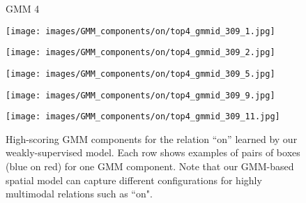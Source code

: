 \documentclass[10pt,twocolumn,letterpaper]{article}
\begin{document}
\begin{figure*}[t]
    \begin{minipage}[b]{0.005\textwidth}
    	\centering
    	\begin{turn}{90}
    GMM 4
    	\end{turn}
    	\vspace{1.5ex}
    \end{minipage}
    \hspace{0.01\textwidth}
    \begin{minipage}[b]{0.18\textwidth}
    	\centering
       	\texttt{[image: images/GMM\_components/on/top4\_gmmid\_309\_1.jpg]}
    \end{minipage}
    \hspace{0.005\textwidth}
    \begin{minipage}[b]{0.18\textwidth}
    	\centering
       	\texttt{[image: images/GMM\_components/on/top4\_gmmid\_309\_2.jpg]}
    \end{minipage}
    \hspace{0.005\textwidth}
    \begin{minipage}[b]{0.18\textwidth}
    	\centering
       	\texttt{[image: images/GMM\_components/on/top4\_gmmid\_309\_5.jpg]}
    \end{minipage}
    \hspace{0.005\textwidth}
	\begin{minipage}[b]{0.18\textwidth}
    	\centering
       	\texttt{[image: images/GMM\_components/on/top4\_gmmid\_309\_9.jpg]}
    \end{minipage}
    \hspace{0.005\textwidth}
    \begin{minipage}[b]{0.18\textwidth}
    	\centering
       	\texttt{[image: images/GMM\_components/on/top4\_gmmid\_309\_11.jpg]}
    \end{minipage}             
     
   \caption{High-scoring GMM components for the relation ``on'' learned by our weakly-supervised model. Each row shows examples of pairs of boxes ({\color{blue}blue} on {\color{red}red}) for one GMM component. Note that our GMM-based spatial model can capture different configurations for highly multimodal relations such as ``on".} 
      \vspace{-.2cm}
    \label{fig:multimodal}
\end{figure*}
\end{document}
